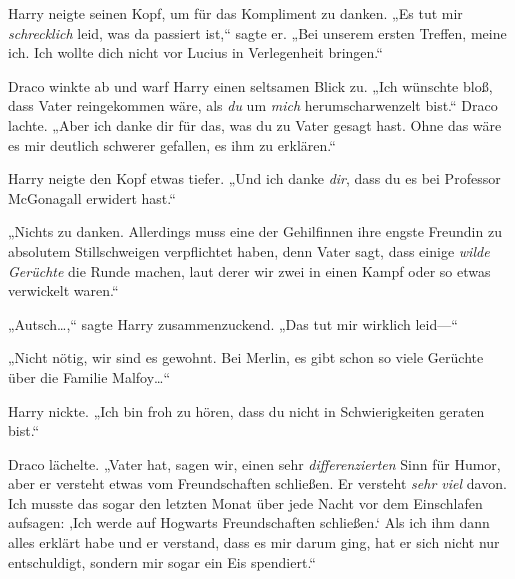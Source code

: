 Harry neigte seinen Kopf, um für das Kompliment zu danken. „Es tut mir \emph{schrecklich} leid, was da passiert ist,“ sagte er. „Bei unserem ersten Treffen, meine ich. Ich wollte dich nicht vor Lucius in Verlegenheit bringen.“

Draco winkte ab und warf Harry einen seltsamen Blick zu. „Ich wünschte bloß, dass Vater reingekommen wäre, als \emph{du} um \emph{mich} herumscharwenzelt bist.“ Draco lachte. „Aber ich danke dir für das, was du zu Vater gesagt hast. Ohne das wäre es mir deutlich schwerer gefallen, es ihm zu erklären.“

Harry neigte den Kopf etwas tiefer. „Und ich danke \emph{dir}, dass du es bei Professor McGonagall erwidert hast.“

„Nichts zu danken. Allerdings muss eine der Gehilfinnen ihre engste Freundin zu absolutem Stillschweigen verpflichtet haben, denn Vater sagt, dass einige \emph{wilde Gerüchte} die Runde machen, laut derer wir zwei in einen Kampf oder so etwas verwickelt waren.“

„Autsch…,“ sagte Harry zusammenzuckend. „Das tut mir wirklich leid—“

„Nicht nötig, wir sind es gewohnt. Bei Merlin, es gibt schon so viele Gerüchte über die Familie Malfoy…“

Harry nickte. „Ich bin froh zu hören, dass du nicht in Schwierigkeiten geraten bist.“

Draco lächelte. „Vater hat, sagen wir, einen sehr \emph{differenzierten} Sinn für Humor, aber er versteht etwas vom Freundschaften schließen. Er versteht \emph{sehr viel} davon. Ich musste das sogar den letzten Monat über jede Nacht vor dem Einschlafen aufsagen: ‚Ich werde auf Hogwarts Freundschaften schließen.‘ Als ich ihm dann alles erklärt habe und er verstand, dass es mir darum ging, hat er sich nicht nur entschuldigt, sondern mir sogar ein Eis spendiert.“


